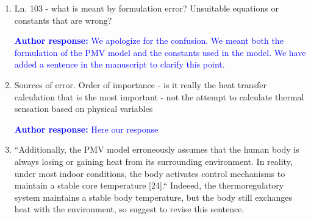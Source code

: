 \documentclass[a4paper, 10pt]{letter}
\newcommand{\response}[1]{\textcolor{blue}{\textbf{Author response:} #1}}
\begin{document}
\begin{letter}
\begin{enumerate}
            \response{
            As previously explained we acknowledge that the PMV model is not intended to predict the thermal sensation of each individual participant.
            We have acknowledged this limitation in the manuscript and discussed it in Section 3.2.
            To compensate for this limitation of our analysis, we calculated the bias of the model as previously done by Humphreys and Nicol (2002) to determine if the model is systematically over or under predicting the thermal sensation of the participants.
            Individual differences in human subjects can be assumed to be random and distributed around the mean.
            This is the same assumption that PMV model also does when trying to predict the average thermal sensation of a large group of occupants.
            Consequently, we believe that calcualting the bias of the model is a valid approach to determine the overall accuracy of the model.
            }

            \item Ln. 103 - what is meant by formulation error?
            Unsuitable equations or constants that are wrong?

            \response{
            We apologize for the confusion.
            We meant both the formulation of the PMV model and the constants used in the model.
            We have added a sentence in the manuscript to clarify this point.
            }

            \item Sources of error.
            Order of importance - is it really the heat transfer calculation that is the most important - not the attempt to calculate thermal sensation based on physical variables

            \response{Here our response}

            \item ``Additionally, the PMV model erroneously assumes that the human body is always losing or gaining heat from its surrounding environment.
            In reality, under most indoor conditions, the body activates control mechanisms to maintain a stable core temperature [24].``
            Indeeed, the thermoregulatory system maintains a stable body temperature, but the body still exchanges heat with the environment, so suggest to revise this sentence.


\end{enumerate}
\end{letter}
\end{document}

